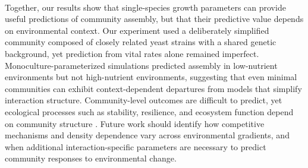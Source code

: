 \paragraph{} Together, our results show that single-species growth parameters can provide useful predictions of community assembly, but that their predictive value depends on environmental context. Our experiment used a deliberately simplified community composed of closely related yeast strains with a shared genetic background, yet prediction from vital rates alone remained imperfect. Monoculture-parameterized simulations predicted assembly in low-nutrient environments but not high-nutrient environments, suggesting that even minimal communities can exhibit context-dependent departures from models that simplify interaction structure. Community-level outcomes are difficult to predict, yet ecological processes such as stability, resilience, and ecosystem function depend on community structure \parencite{de2013predicting, tilman2014biodiversity}. Future work should identify how competitive mechanisms and density dependence vary across environmental gradients, and when additional interaction-specific parameters are necessary to predict community responses to environmental change.

\clearpage


